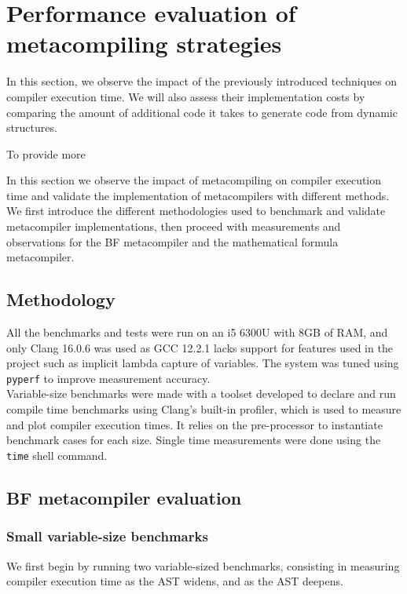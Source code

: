\documentclass[../main]{subfiles}
\begin{document}
\section{Performance evaluation of metacompiling strategies}
\label{lbl:compile-time-eval}

In this section, we observe the impact of the previously introduced techniques
on compiler execution time. We will also assess their implementation costs
by comparing the amount of additional code it takes to generate code from
\constexpr dynamic structures.

To provide more

In this section we observe the impact of metacompiling on compiler execution
time and validate the implementation of metacompilers with different methods.
We first introduce the different methodologies used to benchmark and validate
metacompiler implementations, then proceed with measurements and observations
for the BF metacompiler and the mathematical formula metacompiler.

\subsection{Methodology}

All the benchmarks and tests were run on an i5 6300U with 8GB of RAM, and only
Clang 16.0.6 was used as GCC 12.2.1 lacks support for features used in the
project such as implicit lambda capture of \constexpr variables. The system was
tuned using \lstinline{pyperf} to improve measurement accuracy.
\\

Variable-size benchmarks were made with a toolset developed to declare and run
compile time benchmarks using Clang's built-in profiler, which is used to
measure and plot compiler execution times. It relies on the \cpp pre-processor
to instantiate benchmark cases for each size.
Single time measurements were done using the \lstinline{time} shell command.

\subsection{BF metacompiler evaluation}

\subsubsection{Small variable-size benchmarks}

We first begin by running two variable-sized benchmarks, consisting in
measuring compiler execution time as the AST widens, and as the AST deepens.\\
\end{document}
